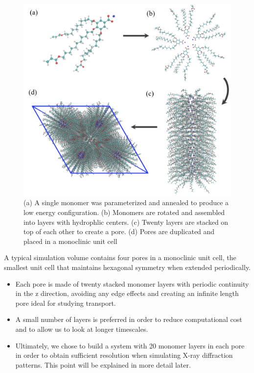\documentclass{article}
\begin{document}
  \begin{figure}[!ht]
	\centering
	\includegraphics[width=0.75\linewidth]{build.PNG} %
	\caption{(a) A single monomer was parameterized and annealed to produce a low energy
		configuration. (b) Monomers are rotated and assembled into layers with 
		hydrophlic centers. (c) Twenty layers are stacked on top of each other to create
		a pore. (d) Pores are duplicated and placed in a monoclinic unit cell}\label{fig:python}
  \end{figure}
  
  A typical simulation volume contains four pores in a monoclinic unit cell,
  the smallest unit cell that maintains hexagonal symmetry when extended 
  periodically.
  \begin{itemize}
    \item Each pore is made of twenty stacked monomer layers with periodic 
    continuity in the z direction, avoiding any edge effects and creating an 
    infinite length pore ideal for studying transport.
    \item A small number of layers is preferred in order to reduce computational
    cost and to allow us to look at longer timescales.
    \item Ultimately, we chose to build a system with 20 monomer layers in each pore
    in order to obtain sufficient resolution when simulating X-ray diffraction patterns.
    This point will be explained in more detail later.
  \end{itemize}
  
\end{document}
